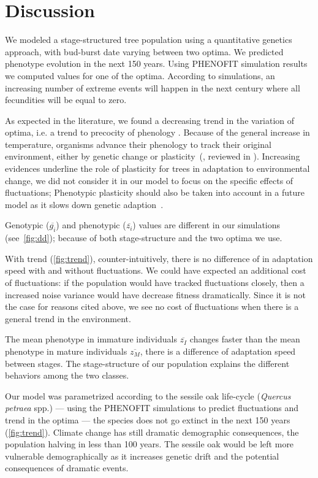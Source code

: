 \label{sec:Disc}
\section*{Discussion}

We modeled a stage-structured tree population using a quantitative genetics approach, with bud-burst date varying between two optima. We predicted phenotype evolution in the next 150 years. Using \textsc{PHENOFIT} simulation results we computed values for one of the optima. According to simulations, an increasing number of extreme events will happen in the next century where all fecundities will be equal to zero.

As expected in the literature, we found a decreasing trend in the variation of optima, i.e. a trend to precocity of phenology \citep{aitken_adaptation_2008, ehrlen_timing_2009}. Because of the general increase in temperature, organisms advance their phenology to track their original environment, either by genetic change or plasticity~(\citealt{savolainen_genetic_2004}, reviewed in \citealt{merila_climate_2014}). Increasing evidences underline the role of plasticity for trees in adaptation to environmental change, we did not consider it in our model to focus on the specific effects of fluctuations; Phenotypic plasticity should also be taken into account in a future model as it slows down genetic adaption~\citep{alberto_potential_2013, aitken_adaptation_2008}. 

Genotypic ($\overline{g_i}$) and phenotypic ($\overline{z_i}$) values are different in our simulations (see~\autoref{fig:dd}); because of both stage-structure and the two optima we use.

With trend (\autoref{fig:trend}), counter-intuitively, there is no difference of in adaptation speed with and without fluctuations. We could have expected an additional cost of fluctuations: if the population would have tracked fluctuations closely, then a increased noise variance would have decrease fitness dramatically. Since it is not the case for reasons cited above, we see no cost of fluctuations when there is a general trend in the environment.

The mean phenotype in immature individuals $\overline{z_I}$ changes faster than the mean phenotype in mature individuals $\overline{z_M}$, there is a difference of adaptation speed between stages. The stage-structure of our population explains the different behaviors among the two classes. 

Our model was parametrized according to the sessile oak life-cycle (\textit{Quercus petraea} spp.) — using the \textsc{PHENOFIT} simulations to predict fluctuations and trend in the optima — the species does not go extinct in the next 150 years (\autoref{fig:trend}). Climate change has still dramatic demographic consequences, the population halving in less than 100 years. The sessile oak would be left more vulnerable demographically as it increases genetic drift and the potential consequences of dramatic events.

